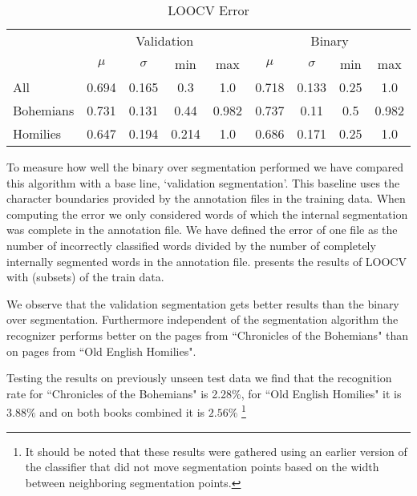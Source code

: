 \begin{table*}[t]
\caption{LOOCV Error}
\label{tab:results:loocv}
\centering
	\begin{tabular}{lcccccccc}
		\toprule
					& \multicolumn{4}{c}{Validation} & \multicolumn{4}{c}{Binary}\\
					\cmidrule(r){2-5} \cmidrule(r){6-9}
		~ 			& $\mu$ 	& $\sigma$ 	& min 	& max 	& $\mu$ 	& $\sigma$ 	& min 	& max \\
		\midrule
		All 		& 0.694 	& 0.165 	& 0.3 	& 1.0 	& 0.718 	& 0.133 	& 0.25 	& 1.0 \\
		Bohemians 	& 0.731 	& 0.131 	& 0.44 	& 0.982 & 0.737 	& 0.11 		& 0.5 	& 0.982 \\
		Homilies 	& 0.647 	& 0.194 	& 0.214 & 1.0 	& 0.686 	& 0.171 	& 0.25 	& 1.0 \\
		\bottomrule
	\end{tabular}
\end{table*}
%
To measure how well the binary over segmentation performed we have compared this algorithm with a base line, `validation segmentation'. This baseline uses the character boundaries provided by the annotation files in the training data. When computing the error we only considered words of which the internal segmentation was complete in the annotation file. We have defined the error of one file as the number of incorrectly classified words divided by the number of completely internally segmented words in the annotation file.  presents the results of LOOCV with (subsets) of the train data. 

We observe that the validation segmentation gets better results than the binary over segmentation. Furthermore independent of the segmentation algorithm the recognizer performs better on the pages from ``Chronicles of the Bohemians" than on pages from ``Old English Homilies".

Testing the results on previously unseen test data we find that the recognition rate for ``Chronicles of the Bohemians" is 2.28\%, for ``Old English Homilies" it is $3.88\%$ and on both books combined it is $2.56\%$ \footnote{It should be noted that these results were gathered using an earlier version of the classifier that did not move segmentation points based on the width between neighboring segmentation points.}